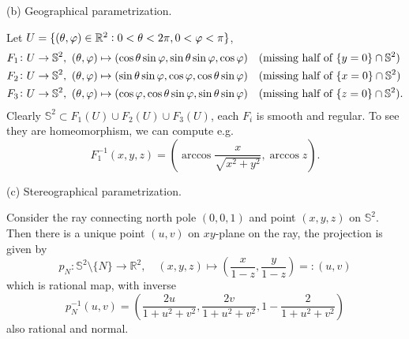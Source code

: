 \noindent (b) Geographical parametrization.

Let \(U=\{(\theta,\varphi)\in \mathbb{R}^2:0<\theta<2\pi,0<\varphi<\pi\}\), 
\begin{align*}
    &F_1\colon U\to \mathbb{S}^2,\ (\theta,\varphi)\mapsto 
    (\cos\theta\sin\varphi,\sin\theta\sin\varphi,\cos\varphi)
    \quad\text{(missing half of }\{y=0\}\cap \mathbb{S}^2\text{)}\\ 
    &F_2\colon U\to \mathbb{S}^2,\ (\theta,\varphi)\mapsto 
    (\sin\theta\sin\varphi,\cos\varphi,\cos\theta\sin\varphi)
    \quad\text{(missing half of }\{x=0\}\cap \mathbb{S}^2\text{)}\\ 
    &F_3\colon U\to \mathbb{S}^2,\ (\theta,\varphi)\mapsto 
    (\cos\varphi,\cos\theta\sin\varphi,\sin\theta\sin\varphi)
    \quad\text{(missing half of }\{z=0\}\cap \mathbb{S}^2\text{)}
.\end{align*}
Clearly \(\mathbb{S}^2\subset F_1(U)\cup F_2(U)\cup F_3(U)\), each \(F_i\) is smooth
and regular. To see they are homeomorphism, we can compute e.g. \[
    F_1^{-1}(x,y,z)=(\arccos \frac{x}{\sqrt{x^2+y^2}}, \arccos z)
.\] 

\noindent (c) Stereographical parametrization.

Consider the ray connecting north pole \((0,0,1)\) and point \((x,y,z)\) on
\(\mathbb{S}^2\). Then there is a unique point \((u,v)\) on \(xy\)-plane on the
ray, the projection is given by \[
    p_N\colon \mathbb{S}^2\setminus\{N\}\to \mathbb{R}^2,
    \quad (x,y,z)\mapsto (\frac{x}{1-z},\frac{y}{1-z})=\colon(u,v)
\] which is rational map, with inverse \[
    p_N^{-1}(u,v)=(\frac{2u}{1+u^2+v^2},\frac{2v}{1+u^2+v^2},1-\frac{2}{1+u^2+v^2})
\] also rational and normal.
